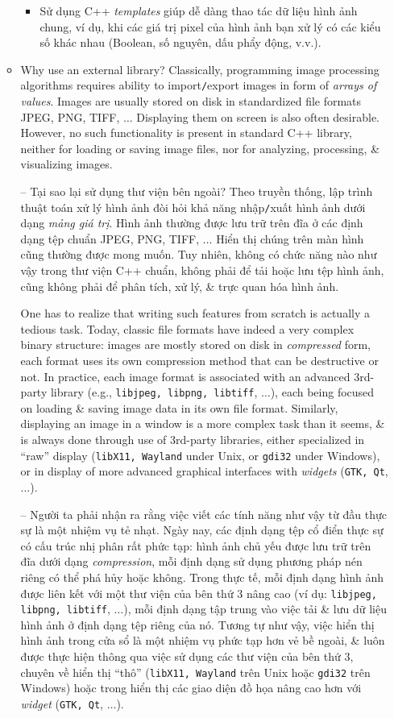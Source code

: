 \documentclass{article}
\begin{document}
\begin{itemize}
\begin{itemize}
\begin{itemize}
            \item Sử dụng C++ {\it templates} giúp dễ dàng thao tác dữ liệu hình ảnh chung, ví dụ, khi các giá trị pixel của hình ảnh bạn xử lý có các kiểu số khác nhau (Boolean, số nguyên, dấu phẩy động, v.v.).
        \end{itemize}        
        \item {\sf Why use an external library?} Classically, programming image processing algorithms requires ability to import{\tt/}export images in form of {\it arrays of values}. Images are usually stored on disk in standardized file formats JPEG, PNG, TIFF, $\ldots$ Displaying them on screen is also often desirable. However, no such functionality is present in standard C++ library, neither for loading or saving image files, nor for analyzing, processing, \& visualizing images.
        
        -- {\sf Tại sao lại sử dụng thư viện bên ngoài?} Theo truyền thống, lập trình thuật toán xử lý hình ảnh đòi hỏi khả năng nhập{\tt/}xuất hình ảnh dưới dạng {\it mảng giá trị}. Hình ảnh thường được lưu trữ trên đĩa ở các định dạng tệp chuẩn JPEG, PNG, TIFF, $\ldots$ Hiển thị chúng trên màn hình cũng thường được mong muốn. Tuy nhiên, không có chức năng nào như vậy trong thư viện C++ chuẩn, không phải để tải hoặc lưu tệp hình ảnh, cũng không phải để phân tích, xử lý, \& trực quan hóa hình ảnh.
        
        One has to realize that writing such features from scratch is actually a tedious task. Today, classic file formats have indeed a very complex binary structure: images are mostly stored on disk in {\it compressed} form, each format uses its own compression method that can be destructive or not. In practice, each image format is associated with an advanced 3rd-party library (e.g., {\tt libjpeg, libpng, libtiff}, $\ldots$), each being focused on loading \& saving image data in its own file format. Similarly, displaying an image in a window is a more complex task than it seems, \& is always done through use of 3rd-party libraries, either specialized in ``raw'' display ({\tt libX11, Wayland} under Unix, or {\tt gdi32} under Windows), or in display of more advanced graphical interfaces with {\it widgets} ({\tt GTK, Qt}, $\ldots$).
        
        -- Người ta phải nhận ra rằng việc viết các tính năng như vậy từ đầu thực sự là một nhiệm vụ tẻ nhạt. Ngày nay, các định dạng tệp cổ điển thực sự có cấu trúc nhị phân rất phức tạp: hình ảnh chủ yếu được lưu trữ trên đĩa dưới dạng {\it compression}, mỗi định dạng sử dụng phương pháp nén riêng có thể phá hủy hoặc không. Trong thực tế, mỗi định dạng hình ảnh được liên kết với một thư viện của bên thứ 3 nâng cao (ví dụ: {\tt libjpeg, libpng, libtiff}, $\ldots$), mỗi định dạng tập trung vào việc tải \& lưu dữ liệu hình ảnh ở định dạng tệp riêng của nó. Tương tự như vậy, việc hiển thị hình ảnh trong cửa sổ là một nhiệm vụ phức tạp hơn vẻ bề ngoài, \& luôn được thực hiện thông qua việc sử dụng các thư viện của bên thứ 3, chuyên về hiển thị ``thô'' ({\tt libX11, Wayland} trên Unix hoặc {\tt gdi32} trên Windows) hoặc trong hiển thị các giao diện đồ họa nâng cao hơn với {\it widget} ({\tt GTK, Qt}, $\ldots$).
        

\end{itemize}
\end{itemize}
\end{document}
